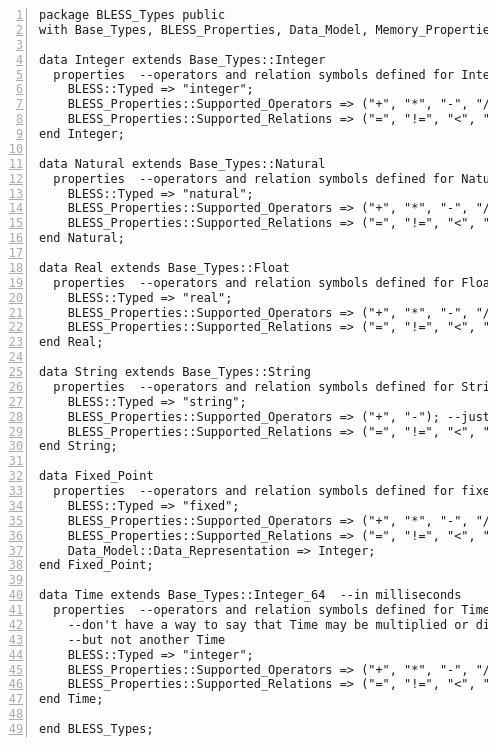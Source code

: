 \singlespacing
\begin{lstlisting}[language=aadl, gobble=0, numbers=left, caption={\lstinline{BLESS_Types} package}]
package BLESS_Types public
with Base_Types, BLESS_Properties, Data_Model, Memory_Properties, BLESS;

data Integer extends Base_Types::Integer
  properties  --operators and relation symbols defined for Integer
    BLESS::Typed => "integer";
    BLESS_Properties::Supported_Operators => ("+", "*", "-", "/", "mod", "rem", "**");
    BLESS_Properties::Supported_Relations => ("=", "!=", "<", "<=", ">=", ">");
end Integer;    
    
data Natural extends Base_Types::Natural
  properties  --operators and relation symbols defined for Natural
    BLESS::Typed => "natural";
    BLESS_Properties::Supported_Operators => ("+", "*", "-", "/", "mod", "rem", "**");
    BLESS_Properties::Supported_Relations => ("=", "!=", "<", "<=", ">=", ">");
end Natural;    
    
data Real extends Base_Types::Float
  properties  --operators and relation symbols defined for Float
    BLESS::Typed => "real";
    BLESS_Properties::Supported_Operators => ("+", "*", "-", "/", "**");
    BLESS_Properties::Supported_Relations => ("=", "!=", "<", "<=", ">=", ">");
end Real;    
    
data String extends Base_Types::String
  properties  --operators and relation symbols defined for String
    BLESS::Typed => "string";
    BLESS_Properties::Supported_Operators => ("+", "-"); --just concatenation
    BLESS_Properties::Supported_Relations => ("=", "!=", "<", "<=", ">=", ">");
end String;    
    
data Fixed_Point
  properties  --operators and relation symbols defined for fixed-point arithmetic
    BLESS::Typed => "fixed";
    BLESS_Properties::Supported_Operators => ("+", "*", "-", "/", "**");
    BLESS_Properties::Supported_Relations => ("=", "!=", "<", "<=", ">=", ">");
    Data_Model::Data_Representation => Integer;
end Fixed_Point;

data Time extends Base_Types::Integer_64  --in milliseconds
  properties  --operators and relation symbols defined for Time
    --don't have a way to say that Time may be multiplied or divided by scalar
    --but not another Time
    BLESS::Typed => "integer";
    BLESS_Properties::Supported_Operators => ("+", "*", "-", "/");
    BLESS_Properties::Supported_Relations => ("=", "!=", "<", "<=", ">=", ">");
end Time;
    
end BLESS_Types;
\end{lstlisting} 
\label{listing:aadl:bless_types}
\doublespacing

